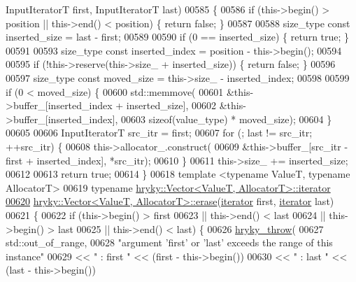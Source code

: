 \begin{DoxyCode}
      InputIteratorT first, InputIteratorT last)
00585 \{
00586     \textcolor{keywordflow}{if} (this->begin() > position || this->end() < position) \{ \textcolor{keywordflow}{return} \textcolor{keyword}{false}; \}
00587 
00588     size\_type \textcolor{keyword}{const} inserted\_size = last - first;
00589 
00590     \textcolor{keywordflow}{if} (0 == inserted\_size) \{ \textcolor{keywordflow}{return} \textcolor{keyword}{true}; \}
00591 
00593     size\_type \textcolor{keyword}{const} inserted\_index = position - this->begin();
00594     
00595     \textcolor{keywordflow}{if} (!this->reserve(this->size\_ + inserted\_size)) \{ \textcolor{keywordflow}{return} \textcolor{keyword}{false}; \}
00596 
00597     size\_type \textcolor{keyword}{const} moved\_size = this->size\_ - inserted\_index;
00598 
00599     \textcolor{keywordflow}{if} (0 < moved\_size) \{
00600         std::memmove(
00601             &this->buffer\_[inserted\_index + inserted\_size],
00602             &this->buffer\_[inserted\_index],
00603             \textcolor{keyword}{sizeof}(value\_type) * moved\_size);
00604     \}
00605 
00606     InputIteratorT src\_itr  = first;
00607     \textcolor{keywordflow}{for} (; last != src\_itr; ++src\_itr) \{
00608         this->allocator\_.construct(
00609             &this->buffer\_[src\_itr - first + inserted\_index], *src\_itr);
00610     \}
00611     this->size\_ += inserted\_size;
00612 
00613     \textcolor{keywordflow}{return} \textcolor{keyword}{true};
00614 \}
00618 \textcolor{keyword}{template} <\textcolor{keyword}{typename} ValueT, \textcolor{keyword}{typename} AllocatorT>
00619 \textcolor{keyword}{typename} \hyperlink{classhryky_1_1iterator_1_1random_1_1_mutable}{hryky::Vector<ValueT, AllocatorT>::iterator}
\hypertarget{vector_8h_source_l00620}{}\hyperlink{classhryky_1_1_vector_ad52743101f866882512ab84704f07ba1}{00620} \hyperlink{classhryky_1_1_vector}{hryky::Vector<ValueT, AllocatorT>::erase}(\hyperlink{classhryky_1_1iterator_1_1random_1_1_mutable}{iterator} first, \hyperlink{classhryky_1_1iterator_1_1random_1_1_mutable}{iterator} last)
00621 \{
00622     \textcolor{keywordflow}{if} (this->begin() > first
00623          || this->end() < last
00624          || this->begin() > last
00625          || this->end() < last) \{
00626         \hyperlink{debug__common_8h_af50606eac4009921527ddcaed392b2c2}{hryky_throw}(
00627             std::out\_of\_range,
00628             \textcolor{stringliteral}{"argument 'first' or 'last' exceeds the range of this instance"}
00629             << \textcolor{stringliteral}{" : first "} << (first - this->begin())
00630             << \textcolor{stringliteral}{" : last "} << (last - this->begin())

\end{DoxyCode}
